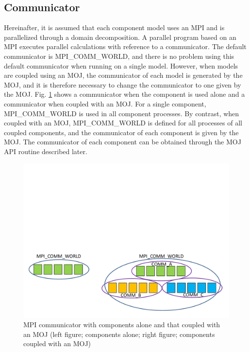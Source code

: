 \documentclass[11pt,a4paper]{report}
\newcommand{\figref}[1]{Fig. \ref{#1}}
\begin{document}
\subsection{Communicator}
Hereinafter, it is assumed that each component model uses an MPI and is parallelized through a domain decomposition.
A parallel program based on an MPI executes parallel calculations with reference to a communicator.
The default communicator is MPI\_COMM\_WORLD, and there is no problem using this default communicator when running on a single model.
However, when models are coupled using an MOJ, the communicator of each model is generated by the MOJ, and it is therefore necessary to change the communicator to one given by the MOJ.
\figref{fig:moj_mpi_comm} shows a communicator when the component is used alone and a communicator when coupled with an MOJ.
For a single component, MPI\_COMM\_WORLD is used in all component processes.
By contrast, when coupled with an MOJ, MPI\_COMM\_WORLD is defined for all processes of all coupled components, and the communicator of each component is given by the MOJ.
The communicator of each component can be obtained through the MOJ API routine described later.

\begin{figure}[H]
\begin{center}
\includegraphics[bb = 0 0 700 300, scale=0.6, clip]{figs/moj_mpi_comm.pdf}
\caption{MPI communicator with components alone and that coupled with an MOJ (left figure; components alone; right figure; components coupled with an MOJ)}
\label{fig:moj_mpi_comm}
\end{center}
\end{figure}
\end{document}
